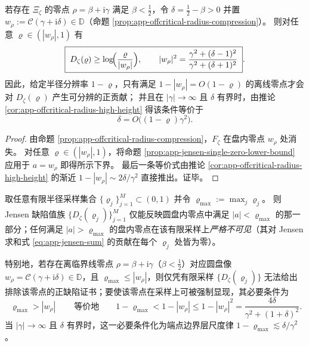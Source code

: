\begin{corollary}[离临界线零点的圆盘可见阈值]\label{cor:app-jensen-visible-threshold-offcritical}
若存在 \(\Xi_{\zeta}\) 的零点 \(\rho=\beta+\mathrm{i}\gamma\) 满足 \(\beta<\tfrac12\)，令 \(\delta=\tfrac12-\beta>0\) 并置
\(
w_{\rho}:=\mathcal{C}(\gamma+\mathrm{i}\delta)\in\mathbb{D}
\)（命题 \ref{prop:app-offcritical-radius-compression}）。
则对任意 \(\varrho\in(|w_{\rho}|,1)\) 有
\[
\boxed{\;
D_{\zeta}(\varrho)\ge \log\!\Bigl(\frac{\varrho}{|w_{\rho}|}\Bigr),
\qquad
|w_{\rho}|^{2}=\frac{\gamma^{2}+(\delta-1)^{2}}{\gamma^{2}+(\delta+1)^{2}}\; }.
\]
因此，给定半径分辨率 \(1-\varrho\)，只有满足 \(1-|w_{\rho}|=O(1-\varrho)\) 的离线零点才会对 \(D_{\zeta}(\varrho)\) 产生可分辨的正贡献；
并且在 \(|\gamma|\to\infty\) 且 \(\delta\) 有界时，由推论 \ref{cor:app-offcritical-radius-high-height} 得该条件等价于
\[
\delta=O\bigl((1-\varrho)\gamma^{2}\bigr).
\]
\end{corollary}
\begin{proof}
由命题 \ref{prop:app-offcritical-radius-compression}，\(F_{\zeta}\) 在盘内零点 \(w_{\rho}\) 处消失。
对任意 \(\varrho\in(|w_{\rho}|,1)\)，将命题 \ref{prop:app-jensen-single-zero-lower-bound} 应用于 \(a=w_{\rho}\) 即得所示下界。
最后一条等价式由推论 \ref{cor:app-offcritical-radius-high-height} 的渐近 \(1-|w_{\rho}|\sim 2\delta/\gamma^{2}\) 直接推出。证毕。
\end{proof}

\begin{corollary}\label{cor:app-jensen-finite-sampling-blindspot}
取任意有限半径采样集合 \(\{\varrho_j\}_{j=1}^{M}\subset(0,1)\) 并令 \(\varrho_{\max}:=\max_j\varrho_j\)。
则 Jensen 缺陷值族 \(\{D_{\zeta}(\varrho_j)\}_{j=1}^{M}\) 仅能反映圆盘内零点中满足 \(|a|<\varrho_{\max}\) 的那一部分；任何满足 \(|a|>\varrho_{\max}\) 的盘内零点在该有限采样上\emph{严格不可见}（其对 Jensen 求和式 \eqref{eq:app-jensen-sum} 的贡献在每个 \(\varrho_j\) 处皆为零）。
\par
特别地，若存在离临界线零点 \(\rho=\beta+\mathrm{i}\gamma\)（\(\beta<\tfrac12\)）对应圆盘像 \(w_{\rho}=\mathcal{C}(\gamma+\mathrm{i}\delta)\in\mathbb{D}\)，且 \(\varrho_{\max}\le |w_{\rho}|\)，则仅凭有限采样 \(\{D_{\zeta}(\varrho_j)\}\) 无法给出排除该零点的正缺陷证书；要使该零点在采样上可被强制显现，其必要条件为
\[
\boxed{\ \varrho_{\max}>|w_{\rho}|\ }\qquad\text{等价地}\qquad
1-\varrho_{\max}<1-|w_{\rho}|
\le 1-|w_{\rho}|^{2}
=\frac{4\delta}{\gamma^{2}+(1+\delta)^{2}}.
\]
当 \(|\gamma|\to\infty\) 且 \(\delta\) 有界时，这一必要条件化为端点边界层尺度律 \(1-\varrho_{\max}\lesssim \delta/\gamma^{2}\)。
\end{corollary}

